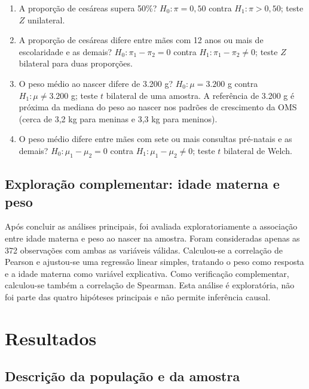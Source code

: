 \documentclass[12pt,a4paper]{article}
\begin{document}
\begin{enumerate}[label=\textbf{H\arabic*:},leftmargin=*]
    \item A proporção de cesáreas supera 50\%? \(H_0:\pi=0{,}50\) contra \(H_1:\pi>0{,}50\); teste \(Z\) unilateral.
    \item A proporção de cesáreas difere entre mães com 12 anos ou mais de escolaridade e as demais? \(H_0:\pi_1-\pi_2=0\) contra \(H_1:\pi_1-\pi_2\ne0\); teste \(Z\) bilateral para duas proporções.
    \item O peso médio ao nascer difere de 3.200 g? \(H_0:\mu=3.200\) g contra \(H_1:\mu\ne3.200\) g; teste \(t\) bilateral de uma amostra. A referência de 3.200 g é próxima da mediana do peso ao nascer nos padrões de crescimento da OMS (cerca de 3,2 kg para meninas e 3,3 kg para meninos).
    \item O peso médio difere entre mães com sete ou mais consultas pré-natais e as demais? \(H_0:\mu_1-\mu_2=0\) contra \(H_1:\mu_1-\mu_2\ne0\); teste \(t\) bilateral de Welch.
\end{enumerate}

\subsection{Exploração complementar: idade materna e peso}

Após concluir as análises principais, foi avaliada exploratoriamente a associação entre idade materna e peso ao nascer na amostra. Foram consideradas apenas as 372 observações com ambas as variáveis válidas. Calculou-se a correlação de Pearson e ajustou-se uma regressão linear simples, tratando o peso como resposta e a idade materna como variável explicativa. Como verificação complementar, calculou-se também a correlação de Spearman. Esta análise é exploratória, não foi parte das quatro hipóteses principais e não permite inferência causal.

\section{Resultados}

\subsection{Descrição da população e da amostra}
\end{document}
